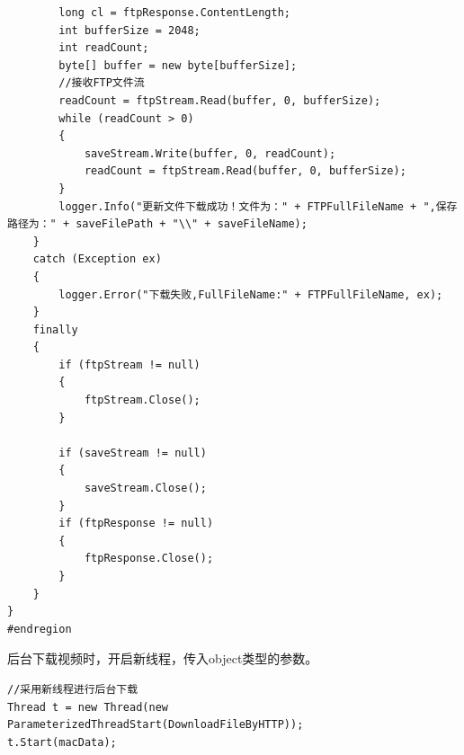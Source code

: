 \documentclass{book}
\begin{document}
\begin{lstlisting}
        long cl = ftpResponse.ContentLength;
        int bufferSize = 2048;
        int readCount;
        byte[] buffer = new byte[bufferSize];
        //接收FTP文件流
        readCount = ftpStream.Read(buffer, 0, bufferSize);
        while (readCount > 0)
        {
            saveStream.Write(buffer, 0, readCount);
            readCount = ftpStream.Read(buffer, 0, bufferSize);
        }
        logger.Info("更新文件下载成功！文件为：" + FTPFullFileName + ",保存路径为：" + saveFilePath + "\\" + saveFileName);
    }
    catch (Exception ex)
    {
        logger.Error("下载失败,FullFileName:" + FTPFullFileName, ex);
    }
    finally
    {
        if (ftpStream != null)
        {
            ftpStream.Close();
        }

        if (saveStream != null)
        {
            saveStream.Close();
        }
        if (ftpResponse != null)
        {
            ftpResponse.Close();
        }
    }
}
#endregion
\end{lstlisting}

后台下载视频时，开启新线程，传入object类型的参数。

\begin{lstlisting}
//采用新线程进行后台下载
Thread t = new Thread(new ParameterizedThreadStart(DownloadFileByHTTP));
t.Start(macData);
\end{lstlisting}
\end{document}
